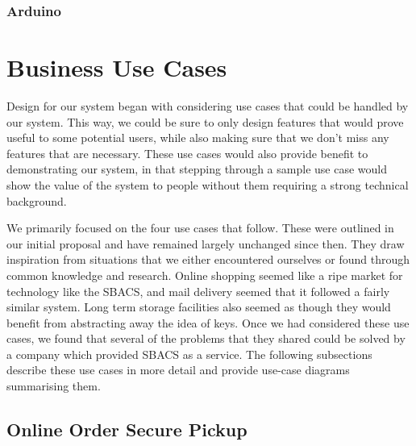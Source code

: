\documentclass[12pt]{report}
\let\Oldsection\section
\renewcommand{\section}{\FloatBarrier\Oldsection}
\let\Oldsubsection\subsection
\renewcommand{\subsection}{\FloatBarrier\Oldsubsection}
\begin{document}

\subsection{Arduino} \label{arduino}




\chapter{Business Use Cases} \label{business-use-cases}

Design for our system began with considering use cases that could be handled by our system. This way, we could be sure
to only design features that would prove useful to some potential users, while also making sure that we don't miss any
features that are necessary. These use cases would also provide benefit to demonstrating our system, in that stepping
through a sample use case would show the value of the system to people without them requiring a strong technical
background.

We primarily focused on the four use cases that follow. These were outlined in our initial proposal and have remained
largely unchanged since then. They draw inspiration from situations that we either encountered ourselves or found
through common knowledge and research. Online shopping seemed like a ripe market for technology like the SBACS, and
mail delivery seemed that it followed a fairly similar system. Long term storage facilities also seemed as though they
would benefit from abstracting away the idea of keys. Once we had considered these use cases, we found that several of
the problems that they shared could be solved by a company which provided SBACS as a service. The following subsections
describe these use cases in more detail and provide use-case diagrams summarising them.


\section{Online Order Secure Pickup} \label{online-order-secure-pickup}
\end{document}
